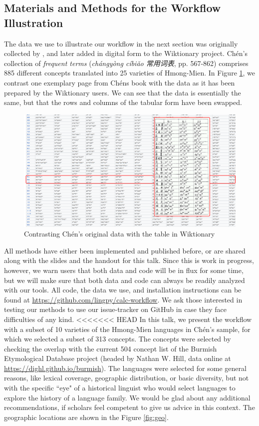 \documentclass[xetex,svgnames]{scrartcl}
\begin{document}
\subsection{Materials and Methods for the Workflow Illustration}

The data we use to illustrate our workflow in the next section was originally collected by
\citet{Chen2012}, and later added in digital form to the Wiktionary project. Chén's collection of
\emph{frequent terms} (\emph{chángyòng cíbiǎo 常用词表}, pp. 567-862) comprises 885 different
concepts translated into 25 varieties of Hmong-Mien. In Figure \ref{fig:data}, we contrast one
exemplary page from Chéns book with the data as it has been prepared by the Wiktionary users.
We can see that the data is essentially the same, but that the rows and columns of the tabular form
have been swapped.

\begin{figure}[htb]
  \centering
  \includegraphics[width=\textwidth]{chen-illustration.pdf}
  \caption{Contrasting Chén's original data with the table in Wiktionary}
  \label{fig:data}
\end{figure}

All methods have either been implemented and published before, or are shared along with the slides
and the handout for this talk. Since this is work in progress, however, we warn users that both data
and code will be in flux for some time, but we will make sure that both data and code can always be
readily analyzed with our tools. All code, the data we use, and installation instructions can be
found at \url{https://github.com/lingpy/calc-workflow}. We ask those interested in testing our
methods to use our issue-tracker on GitHub in case they face difficulties of any kind.
<<<<<<< HEAD
In this talk, we present the workflow with a subset of 10 varieties of the Hmong-Mien languages in
Chén's sample, for which we selected a subset of 313 concepts. The concepts were selected by
checking the overlap with the current 504 concept list of the Burmish Etymological Database project
(headed by Nathan W. Hill, data online at \url{https://dighl.github.io/burmish}). 
The languages were selected for some general reasons, like lexical coverage, geographic
distribution, or basic diversity, but not with the specific ``eye" of a historical linguist who
would select languages to explore the history of a language family. We would be glad about any additional
recommendations, if scholars feel competent to give us advice in this context.
The
geographic locations are shown in the Figure \ref{fig:geo}.
\end{document}
